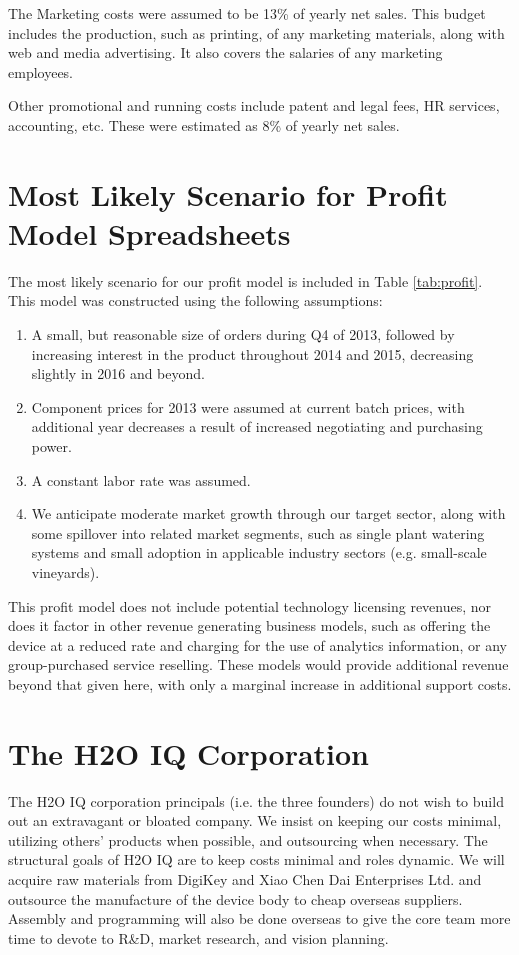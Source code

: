 \documentclass[11pt]{article}
\begin{document}
The Marketing costs were assumed to be 13\% of yearly net sales. This budget includes the production, such as printing, of any marketing materials, along with web and media advertising. It also covers the salaries of any marketing employees.

Other promotional and running costs include patent and legal fees, HR services, accounting, etc. These were estimated as 8\% of yearly net sales.

\section{Most Likely Scenario for Profit Model Spreadsheets}

The most likely scenario for our profit model is included in Table \ref{tab:profit}. This model was constructed using the following assumptions:
\begin{enumerate}
\item A small, but reasonable size of orders during Q4 of 2013, followed by increasing interest in the product throughout 2014 and 2015, decreasing slightly in 2016 and beyond.
\item Component prices for 2013 were assumed at current batch prices, with additional year decreases a result of increased negotiating and purchasing power.
\item A constant labor rate was assumed.
\item We anticipate moderate market growth through our target sector, along with some spillover into related market segments, such as single plant watering systems and small adoption in applicable industry sectors (e.g. small-scale vineyards).
\end{enumerate}

This profit model does not include potential technology licensing revenues, nor does it factor in other revenue generating business models, such as offering the device at a reduced rate and charging for the use of analytics information, or any group-purchased service reselling. These models would provide additional revenue beyond that given here, with only a marginal increase in additional support costs.

\section{The H2O IQ Corporation}

The H2O IQ corporation principals (i.e. the three founders) do not wish to build out an extravagant or bloated company.  We insist on keeping our costs minimal, utilizing others' products when possible, and outsourcing when necessary.  The structural goals of H2O IQ are to keep costs minimal and roles dynamic.  We will acquire raw materials from DigiKey and Xiao Chen Dai Enterprises Ltd. and outsource the manufacture of the device body to cheap overseas suppliers.  Assembly and programming will also be done overseas to give the core team more time to devote to R\&D, market research, and vision planning.
\end{document}
